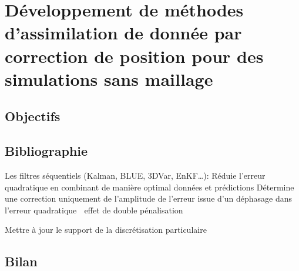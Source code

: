 
\chapter{Développement de méthodes d'assimilation de donnée par correction de position pour des simulations sans maillage}

\section{Objectifs}

\section{Bibliographie}
Les filtres séquentiels (Kalman, BLUE, 3DVar, EnKF…):
Réduie l’erreur quadratique en combinant de manière optimal données et prédictions
Détermine une correction uniquement de l’amplitude
de l’erreur issue d’un déphasage dans l’erreur quadratique  effet de double pénalisation

Mettre à jour le support de la discrétisation particulaire


\section{Bilan}